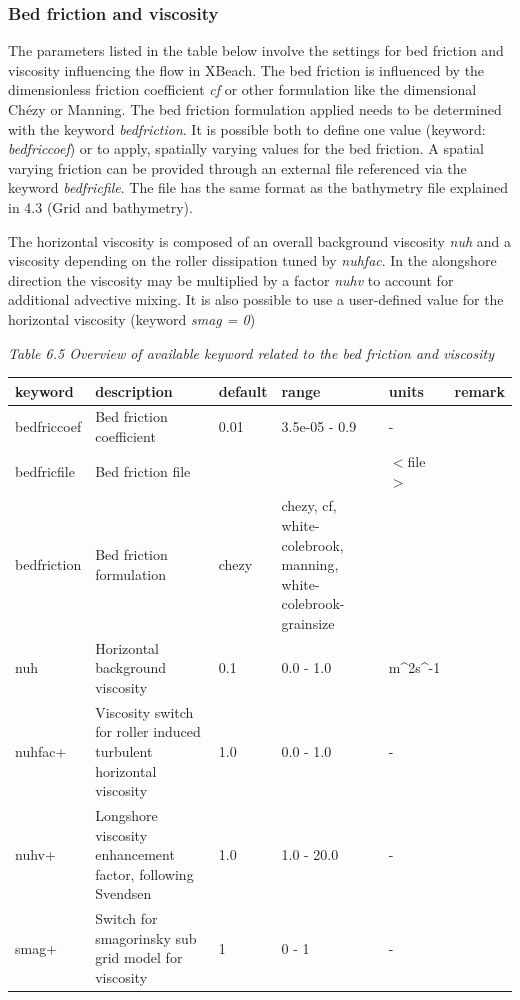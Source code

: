 \documentclass{article}
\begin{document}
\subsubsection{ Bed friction and viscosity}

\noindent The parameters listed in the table below involve the settings for bed friction and viscosity influencing the flow in XBeach. The bed friction is influenced by the dimensionless friction coefficient \textit{cf} or other formulation like the dimensional Chézy or Manning. The bed friction formulation applied needs to be determined with the keyword \textit{bedfriction}. It is possible both to define one value (keyword: \textit{bedfriccoef}) or to apply, spatially varying values for the bed friction. A spatial varying friction can be provided through an external file referenced via the keyword \textit{bedfricfile}. The file has the same format as the bathymetry file explained in 4.3 (Grid and bathymetry).

\noindent The horizontal viscosity is composed of an overall background viscosity \textit{nuh} and a viscosity depending on the roller dissipation tuned by \textit{nuhfac}. In the alongshore direction the viscosity may be multiplied by a factor \textit{nuhv} to account for additional advective mixing. It is also possible to use a user-defined value for the horizontal viscosity (keyword \textit{smag = 0})

\noindent \textit{Table 6.5 Overview of available keyword related to the bed friction and viscosity }

\begin{tabular}{|p{0.8in}|p{0.9in}|p{0.6in}|p{0.8in}|p{0.6in}|p{0.6in}|} \hline 
keyword & description & default & range & units & remark \\ \hline 
bedfriccoef & Bed friction coefficient & 0.01 & 3.5e-05 - 0.9 & - &  \\ \hline 
bedfricfile & Bed friction file  &  &  & $<$file$>$ &  \\ \hline 
bedfriction & Bed friction formulation & chezy & chezy, cf, white-colebrook, manning, white-colebrook-grainsize &  &  \\ \hline 
nuh & Horizontal background viscosity & 0.1 & 0.0 - 1.0 & m\^{}2s\^{}-1 &  \\ \hline 
nuhfac+ & Viscosity switch for roller induced turbulent horizontal viscosity & 1.0 & 0.0 - 1.0 & - &  \\ \hline 
nuhv+ & Longshore viscosity enhancement factor, following Svendsen  & 1.0 & 1.0 - 20.0 & - &  \\ \hline 
smag+ & Switch for smagorinsky sub grid model for viscosity & 1 & 0 - 1 & - &  \\ \hline 
\end{tabular}
\end{document}
